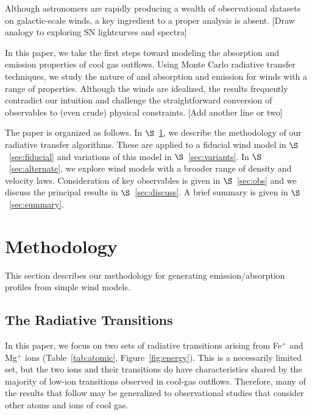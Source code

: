 \documentclass[12pt,preprint]{aastex}
\begin{document}
Although astronomers are rapidly producing a wealth of observational
datasets on galactic-scale winds, a key ingredient to a proper
analysis is absent.
[Draw analogy to exploring SN lightcurves and spectra]

In this paper, we take the first steps toward modeling the absorption
and emission properties of cool gas outflows.  Using Monte Carlo
radiative transfer techniques, we study the nature of  and
 absorption and emission for winds with a range of
properties.  Although the winds are idealized, the results frequently
contradict our intuition and 
challenge the straightforward conversion of observables to (even crude) physical
constraints.  [Add another line or two]

The paper is organized as follows.  In $\S$~\ref{sec:method}, we
describe the methodology of our radiative transfer algorithms.  These
are applied to a fiducial wind model in $\S$~\ref{sec:fiducial} and
variations of this model in $\S$~\ref{sec:variants}.  In
$\S$~\ref{sec:alternate}, we explore wind models with a broader range
of density and velocity laws.  Consideration of key observables is
given in $\S$~\ref{sec:obs} and we discuss the principal results
in $\S$~\ref{sec:discuss}.  A brief summary is given in
$\S$~\ref{sec:summary}.

\section{Methodology}
\label{sec:method}

This section describes our methodology for generating
emission/absorption profiles from simple wind models.

\subsection{The Radiative Transitions}

In this paper, we focus on two sets of radiative transitions
arising from Fe$^+$ and Mg$^+$ ions
(Table~\ref{tab:atomic}, Figure~\ref{fig:energy}).
This is a necessarily limited
set, but the two ions and their transitions do have characteristics
shared by the majority of low-ion transitions
observed in cool-gas outflows. Therefore, many
of the results that follow may be generalized to observational studies that
consider other atoms and ions of cool gas.
\end{document}
